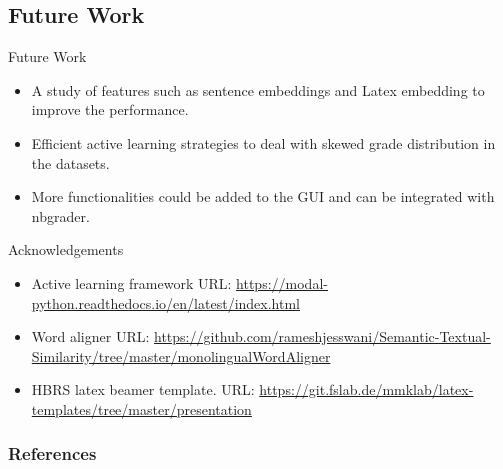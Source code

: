 \documentclass{beamer}
\begin{document}
%	

\subsection{Future Work}
\begin{frame}{Future Work}
	\begin{itemize}
		\item A study of features such as sentence embeddings and Latex embedding to improve the performance.
		\item Efficient active learning strategies to deal with skewed grade distribution in the datasets.
		\item More functionalities could be added to the GUI and can be integrated with nbgrader.
	\end{itemize}
	
\end{frame}


\begin{frame}{Acknowledgements}
		\begin{itemize}
			\item Active learning framework URL: \url{https://modal-python.readthedocs.io/en/latest/index.html}
			\item Word aligner URL: \url{https://github.com/rameshjesswani/Semantic-Textual-Similarity/tree/master/monolingualWordAligner}
			\item HBRS latex beamer template. URL: \url{https://git.fslab.de/mmklab/latex-templates/tree/master/presentation}
			
		\end{itemize}
\end{frame}

\begin{frame}
  \frametitle{References}
  \printbibliography[title={References}]	
\end{frame}
\end{document}
